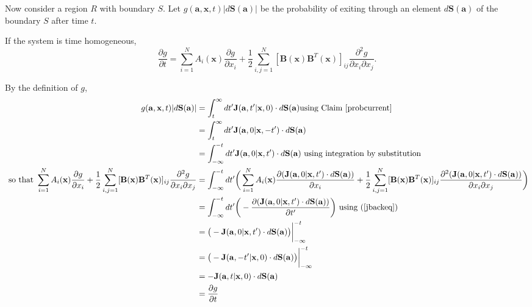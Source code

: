 \documentclass{article}
\newcommand{\mb}{\mathbf}
\begin{document}
Now consider a region $R$ with boundary $S$.  Let $g({\mb a},{\mb x},t)|d{\mb S}({\mb a})|$ be the probability of exiting through an element $d{\mb S}({\mb a})$ of the boundary $S$ after time $t$.

\begin{claim}
If the system is time homogeneous, 
\begin{equation}
\frac{\partial g}{\partial t}=\sum_{i=1}^NA_i({\mb x})\frac{\partial g}{\partial x_i}+\frac{1}{2}\sum_{i,j=1}^N[{\mb B}({\mb x}){\mb B}^T({\mb x})]_{ij}\frac{\partial ^2 g}{\partial x_i\partial x_j}. \label{geq}
\end{equation}
\end{claim}

\begin{pf}
By the definition of $g$,
{\tiny
\begin{align*}
g({\mb a},{\mb x},t)|d{\mb S}({\mb a})|&=\int_t^\infty dt' {\mb J}({\mb a},t'|{\mb x},0)\cdot d{\mb S}(\mb{a}) \text{using Claim \ref{probcurrent}}
\\&=\int_t^\infty dt' {\mb J}({\mb a},0|{\mb x},-t')\cdot d{\mb S}(\mb{a})
\\&=\int_{-\infty}^{-t}dt' {\mb J}({\mb a},0|{\mb x},t')\cdot d{\mb S}(\mb{a}) \text{ using integration by substitution}
\\ \text{ so that }  \sum_{i=1}^NA_i({\mb x})\frac{\partial g}{\partial x_i}+\frac{1}{2}\sum_{i,j=1}^N[{\mb B}({\mb x}){\mb B}^T({\mb x})]_{ij}\frac{\partial ^2 g}{\partial x_i\partial x_j}
&=\int_{-\infty}^{-t} dt'\bigg(\sum_{i=1}^NA_i({\mb x})\frac{\partial ({\mb J}({\mb a},0|{\mb x},t')\cdot d{\mb S}({\mb a}))}{\partial x_i}+\frac{1}{2}\sum_{i,j=1}^N[{\mb B}({\mb x}){\mb B}^T({\mb x})]_{ij}\frac{\partial ^2 ({\mb J}({\mb a},0|{\mb x},t')\cdot d{\mb S}({\mb a}))}{\partial x_i\partial x_j}\bigg)
\\&=\int_{-\infty}^{-t}dt' \bigg(-\frac{\partial ({\mb J}({\mb a},0|{\mb x},t')\cdot d{\mb S}({\mb a}))}{\partial t'}\bigg) \text{ using (\ref{jbackeq})}
\\&=\big(-{\mb J}({\mb a},0|{\mb x},t')\cdot d{\mb S}({\mb a})\big)\bigg|_{-\infty}^{-t}
\\&=\big(-{\mb J}({\mb a},-t'|{\mb x},0)\cdot d{\mb S}({\mb a})\big)\bigg|_{-\infty}^{-t}
\\&=-{\mb J}({\mb a},t|{\mb x},0)\cdot d{\mb S}({\mb a})\
\\&=\frac{\partial g}{\partial t}
\end{align*}
}
\end{pf}
\end{document}
